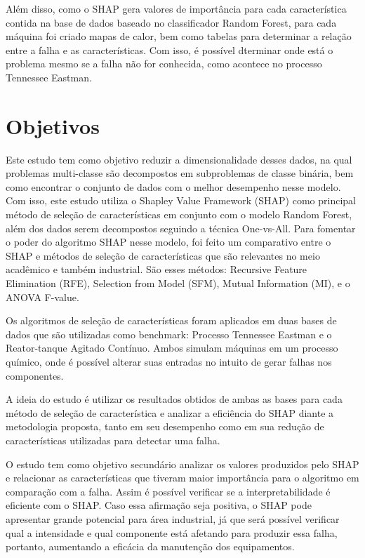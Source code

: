 Além disso, como o SHAP gera valores de importância para cada característica contida na base de dados baseado no classificador Random Forest, para cada máquina foi criado mapas de calor, bem como tabelas para determinar a relação entre a falha e as características. Com isso, é possível dterminar onde está o problema mesmo se a falha não for conhecida, como acontece no processo Tennessee Eastman.

\section{Objetivos}

Este estudo tem como objetivo reduzir a dimensionalidade desses dados, na qual problemas multi-classe são decompostos em subproblemas de classe binária, bem como encontrar o conjunto de dados  com o melhor desempenho nesse modelo. Com isso, este estudo utiliza o Shapley Value Framework (SHAP) como principal método de seleção de características em conjunto com o modelo Random Forest, além dos dados serem decompostos seguindo a técnica One-vs-All. Para fomentar o poder do algoritmo SHAP nesse modelo, foi feito um comparativo entre o SHAP e  métodos de seleção de características que são relevantes no meio acadêmico e também industrial. São esses métodos: Recursive Feature Elimination (RFE), Selection from Model (SFM), Mutual Information (MI), e o ANOVA F-value.

Os algoritmos de seleção de características foram aplicados em duas bases de dados que são utilizadas como benchmark: Processo Tennessee Eastman e o Reator-tanque Agitado Contínuo. Ambos simulam máquinas em um processo químico, onde é possível alterar suas entradas no intuito de gerar falhas nos componentes.

A ideia do estudo é utilizar os resultados obtidos de ambas as bases para cada método de seleção de característica e analizar a eficiência do SHAP diante a metodologia proposta, tanto em seu desempenho como em sua redução de características utilizadas para detectar uma falha.

O estudo tem como objetivo secundário analizar os valores produzidos pelo SHAP e relacionar as características que tiveram maior importância para o algoritmo em comparação com a falha. Assim é possível verificar se a interpretabilidade é eficiente com o SHAP. Caso essa afirmação seja positiva, o SHAP pode apresentar grande potencial para área industrial, já que será possível verificar qual a intensidade e qual componente está afetando para produzir essa falha, portanto, aumentando a eficácia da manutenção dos equipamentos.

